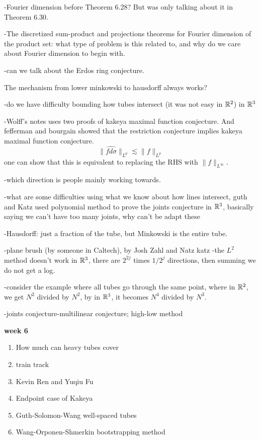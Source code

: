 -Fourier dimension before Theorem 6.28? But was only talking about it in Theorem 6.30.

-The discretized sum-product and projections theorems for Fourier dimension of the product set: what type of problem is this related to, and why do we care about Fourier dimension to begin with.

-can we talk about the Erdos ring conjecture.



The mechanism from lower minkowski to hausdorff always works?

-do we have difficulty bounding how tubes intersect (it was not easy in $\mathbb{R}^2$) in $\mathbb{R}^3$

-Wolff's notes uses two proofs of kakeya maximal function conjecture. And fefferman and bourgain showed that the restriction conjecture implies kakeya maximal function conjecture.
\begin{equation*}
    \|\widehat{fd\sigma}\|_{L^p}\lesssim \|f\|_{L^p}
\end{equation*}
one can show that this is equivalent to replacing the RHS with $\|f\|_{L^\infty}$.

-which direction is people mainly working towards.

-what are some difficulties using what we know about how lines intersect, guth and Katz used polynomial method to prove the joints conjecture in $\mathbb{R}^3$, basically saying we can't have too many joints, why can't be adapt these

-Hausdorff: just a fraction of the tube, but Minkowski is the entire tube.

-plane brush (by someone in Caltech), by Josh Zahl and Natz katz
-the $L^2$ method doesn't work
in $\mathbb{R}^3$, there are $2^{2j}$ times $1/2^{j}$ directions, then summing we do not get a log.

-consider the example where all tubes go through the same point, where in $\mathbb{R}^2$, we get $N^2$ divided by $N^2$, by in $\mathbb{R}^3$, it becomes $N^4$ divided by $N^3$.

-joints conjecture-multilinear conjecture; high-low method


\textbf{week 6}
\begin{enumerate}
    \item How much can heavy tubes cover
    \item train track
    \item Kevin Ren and Yuqiu Fu 
    \item Endpoint case of Kakeya
    \item Guth-Solomon-Wang well-spaced tubes
    \item Wang-Orponen-Shmerkin bootstrapping method
\end{enumerate}

